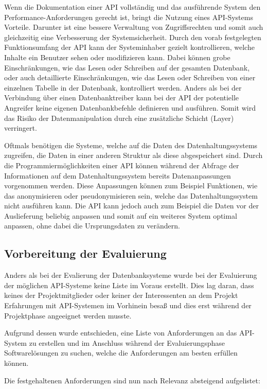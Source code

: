 {Wenn die Dokumentation einer API vollständig und das ausführende System den
Performance\hyp{}Anforderungen gerecht ist, bringt die Nutzung eines
API\hyp{}Systems Vorteile. Darunter ist eine bessere Verwaltung von
Zugriffsrechten und somit auch gleichzeitig eine Verbesserung der
Systemsicherheit. Durch den vorab festgelegten Funktionsumfang der API kann der
Systeminhaber gezielt kontrollieren, welche Inhalte ein Benutzer sehen oder
modifizieren kann. Dabei können grobe Einschränkungen, wie das Lesen oder
Schreiben auf der gesamten Datenbank, oder auch detaillierte Einschränkungen,
wie das Lesen oder Schreiben von einer einzelnen Tabelle in der Datenbank,
kontrolliert werden. Anders als bei der Verbindung über einen Datenbanktreiber
kann bei der API der potentielle Angreifer keine eigenen Datenbankbefehle
definieren und ausführen. Somit wird das Risiko der Datenmanipulation durch
eine zusätzliche Schicht (Layer) verringert.

Oftmals benötigen die Systeme, welche auf die Daten des Datenhaltungssystems
zugreifen, die Daten in einer anderen Struktur als diese abgespeichert sind.
Durch die Programmiermöglichkeiten einer API können während der Abfrage der
Informationen auf dem Datenhaltungssystem bereits Datenanpassungen vorgenommen
werden. Diese Anpassungen können zum Beispiel Funktionen, wie das anonymisieren
oder pseudonymisieren sein, welche das Datenhaltungssystem nicht ausführen
kann. Die API kann jedoch auch zum Beispiel die Daten vor der Auslieferung
beliebig anpassen und somit auf ein weiteres System optimal anpassen, ohne
dabei die Ursprungsdaten zu verändern.
\nl%

\subsection{Vorbereitung der Evaluierung}
\label{subsec:api_vorbereitung_der_evaluierung}
Anders als bei der Evalierung der Datenbanksysteme wurde bei der Evaluierung
der möglichen API\hyp{}Systeme keine Liste im Voraus erstellt. Dies lag daran,
dass keines der Projektmitglieder oder keiner der Interessenten an dem Projekt
Erfahrungen mit API\hyp{}Systemen im Vorhinein besaß und dies erst während der
Projektphase angeeignet werden musste.

Aufgrund dessen wurde entschieden, eine Liste von Anforderungen an das
API\hyp{}System zu erstellen und im Anschluss während der Evaluierungsphase
Softwarelösungen zu suchen, welche die Anforderungen am besten erfüllen können.

Die festgehaltenen Anforderungen sind nun nach Relevanz absteigend aufgelistet:

}
